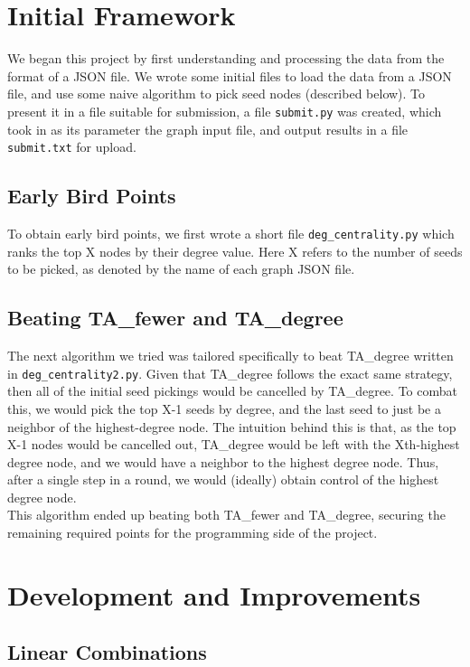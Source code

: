 \documentclass{article}
\begin{document}
\section{Initial Framework}
    We began this project by first understanding and processing the data from the format of a JSON file.
    We wrote some initial files to load the data from a JSON file, and use some naive algorithm to
    pick seed nodes (described below).
    To present it in a file suitable for submission, a file \texttt{submit.py} was 
    created, which took in as its parameter the graph input file, and output results in a file
    \texttt{submit.txt} for upload.
    
    \subsection*{Early Bird Points} 
    To obtain early bird points, we first wrote a short file \texttt{deg\_centrality.py} which
    ranks the top X nodes by their degree value. Here X refers to the number of seeds
    to be picked, as denoted by the name of each graph JSON file. 
    
    \subsection*{Beating TA\_fewer and TA\_degree}
    The next algorithm we tried was tailored specifically to beat TA\_degree
    written in \texttt{deg\_centrality2.py}. Given that
    TA\_degree follows the exact same strategy, then all of the initial seed pickings
    would be cancelled by TA\_degree. To combat this, we would pick the top X-1 seeds by degree,
    and the last seed to just be a neighbor of the highest-degree node. The intuition 
    behind this is that, as the top X-1 nodes would be cancelled out, TA\_degree would be 
    left with the Xth-highest degree node, and we would have a neighbor to the 
    highest degree node. Thus, after a single step in a round, we would (ideally) obtain
    control of the highest degree node. 
    \\
    This algorithm ended up beating both TA\_fewer and TA\_degree, securing the remaining
    required points for the programming side of the project. 
     

\section{Development and Improvements}

\subsection*{Linear Combinations}
\end{document}
